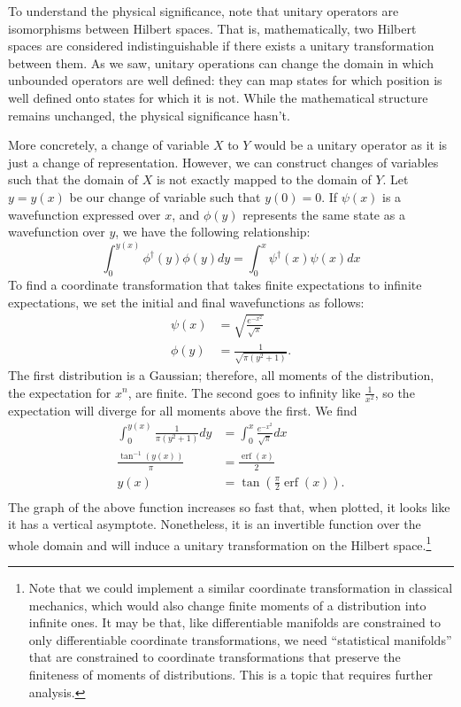 \documentclass[10pt,twocolumn, nofootinbib]{revtex4-2}
\DeclareMathOperator{\erf}{erf}
\begin{document}
To understand the physical significance, note that unitary operators are isomorphisms between Hilbert spaces. That is, mathematically, two Hilbert spaces are considered indistinguishable if there exists a unitary transformation between them. As we saw, unitary operations can change the domain in which unbounded operators are well defined: they can map states for which position is well defined onto states for which it is not. While the mathematical structure remains unchanged, the physical significance hasn't.

More concretely, a change of variable $X$ to $Y$ would be a unitary operator as it is just a change of representation. However, we can construct changes of variables such that the domain of $X$ is not exactly mapped to the domain of $Y$. Let $y=y(x)$ be our change of variable such that $y(0) = 0$. If $\psi(x)$ is a wavefunction expressed over $x$, and $\phi(y)$ represents the same state as a wavefunction over $y$, we have the following relationship:
\begin{equation}
\int_{0}^{y(x)} \phi^\dagger(y) \phi(y) dy = \int_{0}^{x} \psi^\dagger(x) \psi(x) dx
\end{equation}
To find a coordinate transformation that takes finite expectations to infinite expectations, we set the initial and final wavefunctions as follows:
\begin{align}
\psi(x) &= \sqrt{\frac{e^{-x^2}}{\sqrt{\pi}}} \\
\phi(y) &= \frac{1}{\sqrt{\pi(y^2 + 1)}}.
\end{align}
The first distribution is a Gaussian; therefore, all moments of the distribution, the expectation for $x^n$, are finite. The second goes to infinity like $\frac{1}{x^2}$, so the expectation will diverge for all moments above the first. We find
\begin{equation}
\begin{aligned}
\int_{0}^{y(x)} \frac{1}{\pi(y^2 + 1)} dy &= \int_{0}^{x} \frac{e^{-x^2}}{\sqrt{\pi}} dx \\
\frac{\tan^{-1}(y(x))}{\pi} &= \frac{\erf(x)}{2} \\
y(x) &= \tan \left(\frac{\pi}{2}\erf(x)\right). \\
\end{aligned}
\end{equation}
The graph of the above function increases so fast that, when plotted, it looks like it has a vertical asymptote. Nonetheless, it is an invertible function over the whole domain and will induce a unitary transformation on the Hilbert space.\footnote{Note that we could implement a similar coordinate transformation in classical mechanics, which would also change finite moments of a distribution into infinite ones. It may be that, like differentiable manifolds are constrained to only differentiable coordinate transformations, we need ``statistical manifolds'' that are constrained to coordinate transformations that preserve the finiteness of moments of distributions. This is a topic that requires further analysis.}
\end{document}
